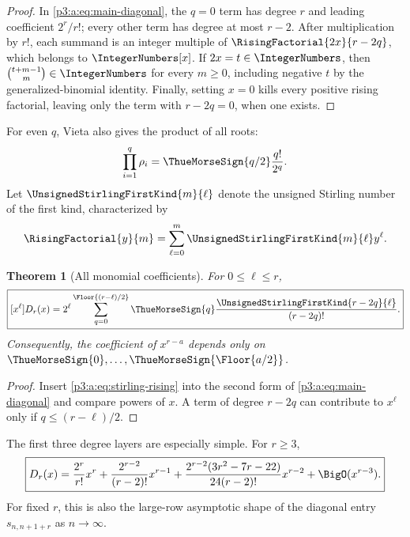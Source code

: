 \documentclass[11pt,oneside]{article}
\numberwithin{equation}{section}
\newtheorem{theorem}{Theorem}[section]
\theoremstyle{definition}
\theoremstyle{remark}
\begin{document}
\begin{proof}
In \eqref{p3:a:eq:main-diagonal}, the \(q=0\) term has degree \(r\) and leading
coefficient \(2^r/r!\); every other term has degree at most \(r-2\).  After
multiplication by \(r!\), each summand is an integer multiple of
\(\RisingFactorial{2x}{r-2q}\), which belongs to \(\IntegerNumbers[x]\).  If \(2x=t\in\IntegerNumbers\), then
\(\binom{t+m-1}{m}\in\IntegerNumbers\) for every \(m\ge0\), including negative \(t\) by
the generalized-binomial identity.  Finally, setting \(x=0\) kills every
positive rising factorial, leaving only the term with \(r-2q=0\), when one
exists.
\end{proof}
For even \(q\), Vieta also gives the product of all roots:
\begin{equation}
 \prod_{i=1}^{q}\rho_i
 =\ThueMorseSign{q/2}\frac{q!}{2^q}.                                \label{p3:c:eq:root-product-even}
\end{equation}
Let \(\UnsignedStirlingFirstKind{m}{\ell}\) denote the unsigned Stirling number of
the first kind, characterized by
\begin{equation}
 \RisingFactorial{y}{m}=\sum_{\ell=0}^{m}
 \UnsignedStirlingFirstKind{m}{\ell}y^\ell.
 \label{p3:a:eq:stirling-rising}
\end{equation}

\begin{theorem}[All monomial coefficients]
For \(0\le\ell\le r\),
\begin{equation}
 \boxed{
 [x^\ell]D_r(x)=
 2^\ell
 \sum_{q=0}^{\Floor{(r-\ell)/2}}
 \ThueMorseSign{q}\frac{\UnsignedStirlingFirstKind{r-2q}{\ell}}{(r-2q)!}.}
 \label{p3:a:eq:all-monomial-coefficients}
\end{equation}
Consequently, the coefficient of \(x^{r-a}\) depends only on
\(\ThueMorseSign{0},\ldots,\ThueMorseSign{\Floor{a/2}}\).
\end{theorem}

\begin{proof}
Insert \eqref{p3:a:eq:stirling-rising} into the second form of
\eqref{p3:a:eq:main-diagonal} and compare powers of \(x\).  A term of degree
\(r-2q\) can contribute to \(x^\ell\) only if \(q\le(r-\ell)/2\).
\end{proof}

The first three degree layers are especially simple.  For \(r\ge3\),
\begin{equation}
 \boxed{
 D_r(x)=
 \frac{2^r}{r!}x^r
 +\frac{2^{r-2}}{(r-2)!}x^{r-1}
 +\frac{2^{r-2}(3r^2-7r-22)}{24(r-2)!}x^{r-2}
 +\BigO(x^{r-3}).}
 \label{p3:a:eq:top-three-layers}
\end{equation}
For fixed \(r\), this is also the large-row asymptotic shape of the diagonal
entry \(s_{n,n+1+r}\) as \(n\to\infty\).
\end{document}
